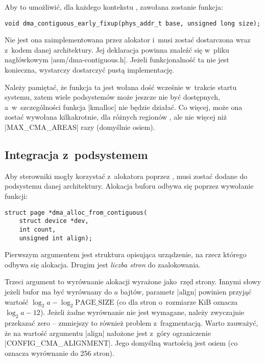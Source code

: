 Aby to umożliwić, dla każdego kontekstu , zawołana zostanie funkcja:

\begin{lstlisting}[numbers=none,columns=fullflexible]
void dma_contiguous_early_fixup(phys_addr_t base, unsigned long size);
\end{lstlisting}

Nie jest ona zaimplementowana przez alokator  i~musi zostać
dostarczona wraz z~kodem danej architektury.  Jej deklaracja powinna
znaleźć się w~pliku nagłówkowym \code|asm/dma-contiguous.h|.  Jeżeli
funkcjonalność ta nie jest konieczna, wystarczy dostarczyć pustą
implementację.

Należy pamiętać, że funkcja ta jest wołana dość wcześnie w~trakcie
startu systemu, zatem wiele podsystemów może jeszcze nie być
dostępnych, a~w~szczególności funkcja \code|kmalloc| nie będzie
działać.  Co więcej, może ona zostać wywołana kilkakrotnie, dla
różnych regionów , ale nie więcej niż \code|MAX_CMA_AREAS| razy
(domyślnie osiem).

\subsection{Integracja z~podsystemem }\label{sec:usage-integrate}

Aby sterowniki mogły korzystać z~alokatora  poprzez  , 
musi zostać dodane do podsystemu  danej architektury.  Alokacja
buforu  odbywa się poprzez wywołanie funkcji:

\begin{lstlisting}
struct page *dma_alloc_from_contiguous(
	struct device *dev,
	int count,
	unsigned int align);
\end{lstlisting}

Pierwszym argumentem jest struktura opisująca urządzenie, na rzecz
którego odbywa się alokacja.  Drugim jest \emph{liczba stron} do
zaalokowania.

Trzeci argument to wyrównanie alokacji wyrażone jako~rzęd strony.
Innymi słowy jeżeli bufor ma być wyrównany do $a$ bajtów, parametr
\code|align| powinien przyjąć wartość $\log_2 a - \log_2
\mathrm{PAGE\_SIZE}$ (co dla stron o~rozmiarze \unit[4096]{KiB}
oznacza $\log_2 a - 12$).  Jeżeli żadne wyrównanie nie jest wymagane,
należy zwyczajnie przekazać zero -- zmniejszy to również problem
z~fragmentacją.  Warto zauważyć, że na wartość argumentu \code|align|
nałożone jest z~góry ograniczenie \code|CONFIG_CMA_ALIGNMENT|.  Jego
domyślną wartością jest osiem (co oznacza wyrównanie do 256 stron).

